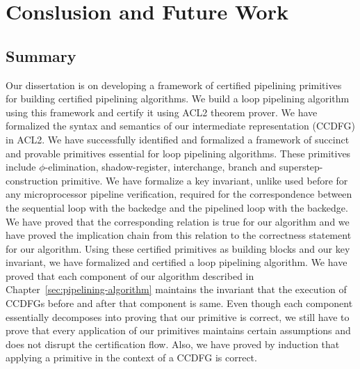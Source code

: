 \chapter{Conslusion and Future Work}
\label{sec:research-plan}

\section{Summary}
Our dissertation is on developing a framework of certified pipelining primitives for building certified pipelining algorithms. We build a loop pipelining algorithm using this framework and certify it using ACL2 theorem prover. We have formalized the syntax and semantics of our intermediate representation (CCDFG) in ACL2. We have successfully identified and formalized a framework of succinct and provable primitives essential for loop pipelining algorithms. These primitives include $\phi$-elimination, shadow-register, interchange, branch and superstep-construction primitive. We have formalize a key invariant, unlike used before for any microprocessor pipeline verification, required for the correspondence between the sequential loop with the backedge and the pipelined loop with the backedge. We have proved that the corresponding relation is true for our algorithm and we have proved the implication chain from this relation to the correctness statement for our algorithm. Using these certified primitives as building blocks and our key invariant, we have formalized and certified a loop pipelining algorithm.
We have proved that each component of our algorithm described in Chapter~\ref{sec:pipelining-algorithm} maintains the invariant that the execution of CCDFGs before and after that component is same. Even though each component essentially decomposes into proving that our primitive is correct, we still have to prove that every application of our primitives maintains certain assumptions and does not disrupt the certification flow. Also, we have proved by induction that applying a primitive in the context of a CCDFG is correct.


